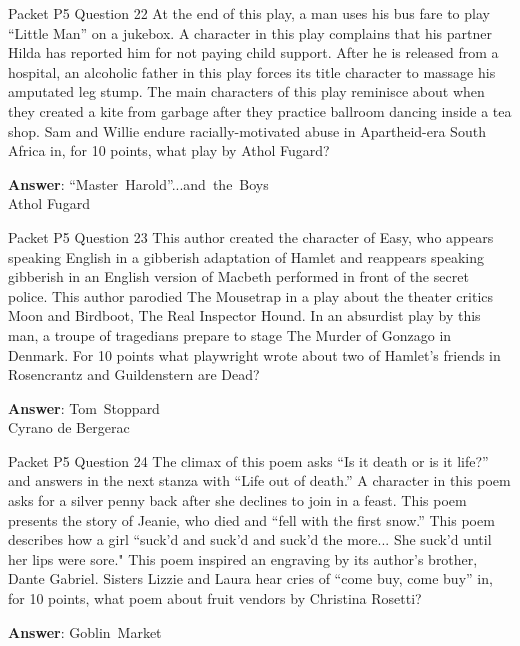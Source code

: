 \begin{frame}{Packet P5 Question 22}
At the end of this play, a man uses his bus fare to play ``Little Man'' on a jukebox. A character in this   play complains that his partner Hilda has reported him for not paying child support. After he is released from a hospital, an alcoholic father in this play forces its title character to massage his amputated leg stump. The main characters of this play reminisce about when they created a kite from garbage after they practice ballroom dancing   inside a tea shop. Sam and Willie endure racially-motivated abuse in Apartheid-era   South Africa   in, for 10 points, what play by Athol Fugard?

\textbf{Answer}: ``Master\ Harold''...and\ the\ Boys\\
 Athol Fugard
\end{frame}

\begin{frame}{Packet P5 Question 23}
This author created the character of Easy, who appears speaking English in a gibberish adaptation of Hamlet and reappears speaking gibberish in   an English version of Macbeth performed in front of the secret police. This author parodied The Mousetrap in a play about the theater critics Moon and Birdboot, The Real Inspector   Hound. In an absurdist   play by this man, a troupe of tragedians prepare to stage   The Murder of Gonzago in Denmark. For 10 points what playwright wrote about two of Hamlet's friends   in Rosencrantz and Guildenstern are Dead?

\textbf{Answer}: Tom\ Stoppard\\
 Cyrano de Bergerac
\end{frame}

\begin{frame}{Packet P5 Question 24}
The climax of this poem asks ``Is it death or is it life?'' and answers in the next stanza with ``Life out of death.'' A character in this poem asks for a silver penny back after she declines to join in a feast. This poem presents the story of Jeanie, who died and ``fell   with the first snow.'' This poem describes how a girl “suck’d and suck’d and suck’d the more... She suck’d until her lips were sore." This poem inspired an engraving by its author’s brother, Dante Gabriel. Sisters Lizzie and Laura hear     cries of “come buy, come buy” in, for 10 points, what poem about fruit vendors by   Christina Rosetti?

\textbf{Answer}: Goblin\ Market\\
\end{frame}

